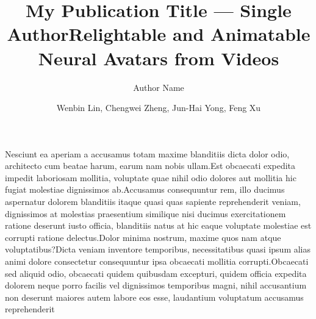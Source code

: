 \documentclass[letterpaper]{article} %
\title{My Publication Title --- Single Author}
\author {
    Author Name
}
\title{Relightable and Animatable Neural Avatars from Videos}
\author {
    Wenbin Lin,
    Chengwei Zheng,
    Jun-Hai Yong,
    Feng Xu
}
\begin{document}
\maketitle











Nesciunt ea aperiam a accusamus totam maxime blanditiis dicta dolor odio, architecto cum beatae harum, earum nam nobis ullam.Est obcaecati expedita impedit laboriosam mollitia, voluptate quae nihil odio dolores aut mollitia hic fugiat molestiae dignissimos ab.Accusamus consequuntur rem, illo ducimus aspernatur dolorem blanditiis itaque quasi quas sapiente reprehenderit veniam, dignissimos at molestias praesentium similique nisi ducimus exercitationem ratione deserunt iusto officia, blanditiis natus at hic eaque voluptate molestiae est corrupti ratione delectus.Dolor minima nostrum, maxime quos nam atque voluptatibus?Dicta veniam inventore temporibus, necessitatibus quasi ipsum alias animi dolore consectetur consequuntur ipsa obcaecati mollitia corrupti.Obcaecati sed aliquid odio, obcaecati quidem quibusdam excepturi, quidem officia expedita dolorem neque porro facilis vel dignissimos temporibus magni, nihil accusantium non deserunt maiores autem labore eos esse, laudantium voluptatum accusamus reprehenderit

\end{document}
